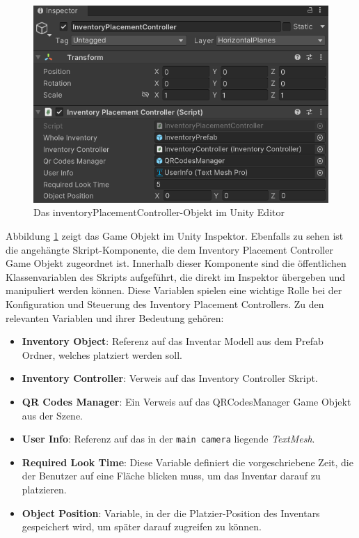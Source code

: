 \begin{figure}[H]
    \centering
    \includegraphics[scale=0.8]{images/invPlace_Editor}
    \caption{Das inventoryPlacementController-Objekt im Unity Editor}
    \label{fig:inventoryPlacementController_Editor}
\end{figure}

Abbildung \ref{fig:inventoryPlacementController_Editor} zeigt das Game Objekt im Unity Inspektor. Ebenfalls zu sehen ist
die angehängte Skript-Komponente, die dem Inventory Placement Controller Game Objekt zugeordnet ist. Innerhalb dieser
Komponente sind die öffentlichen Klassenvariablen des Skripts aufgeführt, die direkt im Inspektor übergeben und manipuliert
werden können. Diese Variablen spielen eine wichtige Rolle bei der Konfiguration und Steuerung des Inventory Placement
Controllers. Zu den relevanten Variablen und ihrer Bedeutung gehören:

\begin{itemize}
    \item \textbf{Inventory Object}: Referenz auf das Inventar Modell aus dem Prefab Ordner, welches platziert werden soll.

    \item \textbf{Inventory Controller}: Verweis auf das Inventory Controller Skript.

    \item \textbf{QR Codes Manager}: Ein Verweis auf das QRCodesManager Game Objekt aus der Szene.

    \item \textbf{User Info}: Referenz auf das in der \texttt{main camera} liegende \textit{TextMesh}.

    \item \textbf{Required Look Time}: Diese Variable definiert die vorgeschriebene Zeit, die der Benutzer auf eine
    Fläche blicken muss, um das Inventar darauf zu platzieren.

    \item \textbf{Object Position}: Variable, in der die Platzier-Position des Inventars gespeichert wird, um später
    darauf zugreifen zu können.
\end{itemize}

